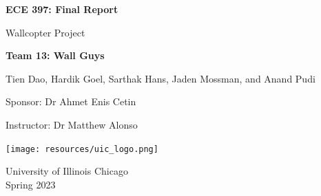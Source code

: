 \documentclass[12pt]{article}
\begin{document}
    \begin{titlepage}
        \begin{center}
            \vspace*{1cm}
            \Huge\textbf{ECE 397: Final Report}

                \vspace{0.5cm}
                \LARGE Wallcopter Project
    
            \vspace{1.5cm}
            \textbf{Team 13: Wall Guys}

                \vspace{0.5cm}
                Tien Dao, Hardik Goel, Sarthak Hans, Jaden Mossman, and Anand Pudi

                \Large
                Sponsor: Dr Ahmet Enis Cetin

                Instructor: Dr Matthew Alonso

                \LARGE

            \vfill             
            \texttt{[image: resources/uic\_logo.png]}

            \vspace{0.8cm}
            University of Illinois Chicago\\
            Spring 2023
                
        \end{center}
    \end{titlepage}

    \tableofcontents

    \newpage
\end{document}
